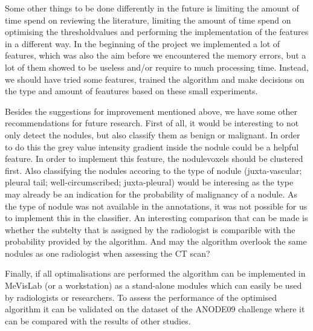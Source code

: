 Some other things to be done differently in the future is limiting the amount
of time spend on reviewing the literature, limiting the amount of time spend
on optimising the thresholdvalues and performing the implementation of the
features in a different way. In the beginning of the project we implemented a
lot of features, which was also the aim before we encountered the memory
errors, but a lot of them showed to be useless and/or require to much processing
time. Instead, we should have tried some features, trained the algorithm and
make decisions on the type and amount of feautures based on these small
experiments.

Besides the suggestions for improvement mentioned above, we have some other
recommendations for future research. First of all, it would be interesting to
not only detect the nodules, but also classify them as benign or malignant. In
order to do this the grey value intensity gradient inside the nodule could be a
helpful feature. In order to implement this feature, the nodulevoxels should be
clustered first. Also classifying the nodules accoring to the type of nodule
(juxta-vascular; pleural tail; well-circumscribed; juxta-pleural) would be
interesing as the type may already be an indication for the probability of
malignancy of a nodule. As the type of nodule was not available in the
annotations, it was not possible for us to implement this in the classifier.
An interesting comparison that can be made is whether the subtelty
that is assigned by the radiologist is comparible with the probability provided
by the algorithm. And may the algorithm overlook the same nodules as one
radiologist when assessing the CT scan?

Finally, if all optimalisations are
performed the algorithm can be implemented in MeVisLab (or a workstation) as a
stand-alone modules which can easily be used by radiologists or researchers. To
assess the performance of the optimised algorithm it can be validated on the
dataset of the ANODE09 challenge where it can be compared with the results of
other studies.

